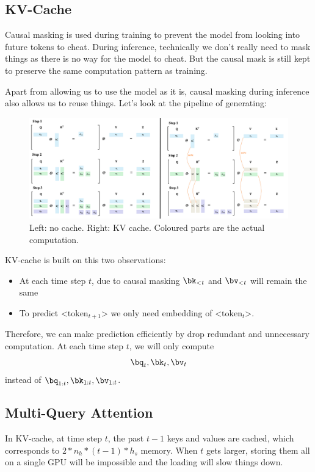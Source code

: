 \documentclass{article}
\begin{document}
\subsection{KV-Cache}
Causal masking is used during training to prevent the model from looking into future tokens to cheat.
During inference, technically we don't really need to mask things as there is no way for the model to cheat.
But the causal mask is still kept to preserve the same computation pattern as training.


Apart from allowing us to use the model as it is, causal masking during inference also allows us to reuse things. 
Let's look at the pipeline of generating:

\begin{figure}[!h]
\centering
\includegraphics[scale=0.25]{imgs/kv-cache.png}
\caption{Left: no cache. Right: KV cache. Coloured parts are the actual computation.}
\end{figure}

KV-cache is built on this two observations:
\begin{itemize}
	\item At each time step $t$, due to causal masking $\bk_{<t}$ and $\bv_{<t}$ will remain the same
	\item To predict <$\text{token}_{t+1}$> we only need embedding of <$\text{token}_{t}$>.
\end{itemize}
Therefore, we can make prediction efficiently by drop redundant and unnecessary computation. At each time step $t$, we will only compute
\[
\bq_t, \bk_t, \bv_t
\]
instead of $\bq_{1:t}, \bk_{1:t}, \bv_{1:t}$.

\clearpage

\subsection{Multi-Query Attention}
In KV-cache, at time step $t$, the past $t-1$ keys and values are cached, which corresponds to $2 * n_h * (t-1) * h_s$ memory. 
When $t$ gets larger, storing them all on a single GPU will be impossible and the loading will slow things down.
\end{document}

